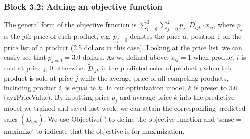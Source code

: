 \documentclass[letterpaper,10pt,english]{jupyterBook}
\begin{document}
\subsubsection{Block 3.2: Adding an objective function}
\label{\detokenize{docs/Case1_4_Module2A_Retail_Price_Optimization:block-3-2-adding-an-objective-function}}
\sphinxAtStartPar
The general form of the objective function is \(\sum_{i=0}^3 \sum_{j=0}^2 p_{j} \cdot \tilde{D}_{ijk} \cdot x_{ij}\), where \(p_{j}\) is the \(j\)th price of each product, e.g. \(p_{j=0}\) denotes the price at position 1 on the price list of a product (2.5 dollars in this case). Looking at the price list, we can easily see that \(p_{j=1}=3.0\) dollars. As we defined above, \(x_{ij}=1\) when product \(i\) is sold at price \(j\), 0 otherwise. \(\tilde{D}_{ijk}\) is the predicted sales of product \(i\) when this product is sold at price \(j\) while the average price of all competing products, including product \(i\), is equal to \(k\). In our optimization model, \(k\) is preset to 3.0 (avgPriceValue). By inputting price \(p_{j}\) and average price \(k\) into the predictive model we trained and saved last week, we can attain the corresponding predicted sales \(\left( \tilde{D}_{ijk} \right)\). We use Objective(\(\cdot\)) to define the objective function and ‘sense = maximize’ to indicate that the objective is for maximization.
\end{document}
